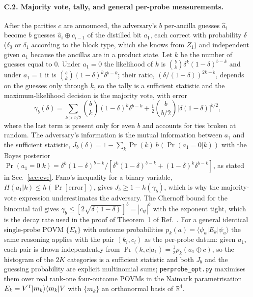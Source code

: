 \documentclass[aps,pra,twocolumn,superscriptaddress,nofootinbib]{revtex4-2}
\begin{document}
\paragraph*{C.2. Majority vote, tally, and general per-probe measurements.} After the parities $c$ are announced, the adversary's $b$ per-ancilla guesses $\hat a_i$ become $b$ guesses $\hat a_i\oplus c_{i-1}$ of the distilled bit $a_1$, each correct with probability $\delta$ ($\delta_0$ or $\delta_1$ according to the block type, which she knows from $Z_1$) and independent given $a_1$ because the ancillas are in a product state. Let $k$ be the number of guesses equal to $0$. Under $a_1=0$ the likelihood of $k$ is $\binom bk\delta^k(1-\delta)^{b-k}$ and under $a_1=1$ it is $\binom bk(1-\delta)^k\delta^{b-k}$; their ratio, $(\delta/(1-\delta))^{2k-b}$, depends on the guesses only through $k$, so the tally is a sufficient statistic and the maximum-likelihood decision is the majority vote, with error
$$\gamma_b(\delta)=\sum_{k>b/2}\binom bk(1-\delta)^k\delta^{b-k}+\tfrac12\binom{b}{b/2}\big[\delta(1-\delta)\big]^{b/2},$$
where the last term is present only for even $b$ and accounts for ties broken at random. The adversary's information is the mutual information between $a_1$ and the sufficient statistic, $J_b(\delta)=1-\sum_k\Pr(k)\,h(\Pr(a_1=0|k))$ with the Bayes posterior $\Pr(a_1=0|k)=\delta^k(1-\delta)^{b-k}/[\delta^k(1-\delta)^{b-k}+(1-\delta)^k\delta^{b-k}]$, as stated in Sec.~\ref{sec:eve}. Fano's inequality for a binary variable, $H(a_1|k)\le h(\Pr[\text{error}])$, gives $J_b\ge1-h(\gamma_b)$, which is why the majority-vote expression underestimates the adversary. The Chernoff bound for the binomial tail gives $\gamma_b\le[2\sqrt{\delta(1-\delta)}]^b=|c_\psi|^b$ with the exponent tight, which is the decay rate used in the proof of Theorem~1 of Ref.~\cite{GW99}. For a general identical single-probe POVM $\{E_k\}$ with outcome probabilities $p_k(a)=\langle\psi_a|E_k|\psi_a\rangle$ the same reasoning applies with the pair $(k_i,c_i)$ as the per-probe datum: given $a_1$, each pair is drawn independently from $\Pr(k,c|a_1)=\tfrac12p_k(a_1\oplus c)$, so the histogram of the $2K$ categories is a sufficient statistic and both $J_b$ and the guessing probability are explicit multinomial sums; \texttt{perprobe\_opt.py} maximises them over real rank-one four-outcome POVMs in the Naimark parametrisation $E_k=V^{\rm T}|m_k\rangle\langle m_k|V$ with $\{m_k\}$ an orthonormal basis of $\mathbb R^4$.
\end{document}
